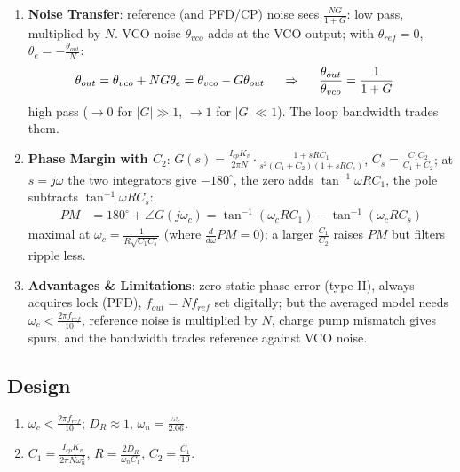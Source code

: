 \begin{enumerate}
  \item \textbf{Noise Transfer}: reference (and PFD/CP) noise sees
    \(\frac{N G}{1 + G}\): low pass, multiplied by \(N\). VCO noise
    \(\theta_{vco}\) adds at the VCO output; with \(\theta_{ref} = 0\),
    \(\theta_e = -\frac{\theta_{out}}{N}\):
    \begin{align*}
      \theta_{out} &= \theta_{vco} + N G\theta_e = \theta_{vco} - G\theta_{out}
      \hspace{0.5cm} \Rightarrow \hspace{0.5cm} \frac{\theta_{out}}{\theta_{vco}} = \frac{1}{1 + G}
    \end{align*}
    high pass (\(\to 0\) for \(|G| \gg 1\), \(\to 1\) for \(|G| \ll 1\)). The loop bandwidth trades them.
  \item \textbf{Phase Margin with \(C_2\)}: \(G(s) = \frac{I_{cp}K_v}{2\pi N}\cdot\frac{1 + sRC_1}{s^2(C_1 + C_2)(1 + sRC_s)}\), \(C_s = \frac{C_1C_2}{C_1 + C_2}\); at \(s = j\omega\)
    the two integrators give \(-180^\circ\), the zero adds \(\tan^{-1}\omega RC_1\), the pole subtracts \(\tan^{-1}\omega RC_s\):
    \begin{align*}
      PM &= 180^\circ + \angle G(j\omega_c) = \tan^{-1}(\omega_c RC_1) - \tan^{-1}(\omega_c RC_s)
    \end{align*}
    maximal at \(\omega_c = \frac{1}{R\sqrt{C_1C_s}}\) (where \(\frac{d}{d\omega}PM = 0\)); a larger \(\frac{C_1}{C_2}\) raises \(PM\) but filters ripple less.
  \item \textbf{Advantages \& Limitations}: zero static phase error (type II), always acquires
    lock (PFD), \(f_{out} = N f_{ref}\) set digitally; but the averaged model needs
    \(\omega_c < \frac{2\pi f_{ref}}{10}\), reference noise is multiplied by \(N\), charge pump mismatch
    gives spurs, and the bandwidth trades reference against VCO noise.
\end{enumerate}

\subsection{Design}
\begin{enumerate}
  \item \(\omega_c < \frac{2\pi f_{ref}}{10}\); \(D_R \approx 1\), \(\omega_n = \frac{\omega_c}{2.06}\).
  \item \(C_1 = \frac{I_{cp} K_v}{2\pi N \omega_n^2}\), \(R = \frac{2 D_R}{\omega_n C_1}\), \(C_2 = \frac{C_1}{10}\).
\end{enumerate}

